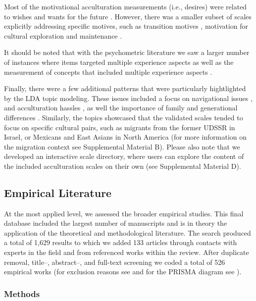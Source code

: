 Most of the motivational acculturation measurements (i.e., desires) were
related to wishes and wants for the future
\citep[e.g.,][]{Mancini2014, Ben-Shalom2003}. However, there was a
smaller subset of scales explicitly addressing specific motives, such as
transition motives \citep[][]{Mchitarjan2015}, motivation for cultural
exploration and maintenance \citep[][]{Recker2017}.

It should be noted that with the psychometric literature we saw a larger
number of instances where items targeted multiple experience aspects
\citep[e.g., enjoyment of wearing traditional clothing][]{Ozer2016} as
well as the measurement of concepts that included multiple experience
aspects \citep[e.g., satisfaction,][]{Cuellar1995a}.

Finally, there were a few additional patterns that were particularly
hightlighted by the LDA topic modeling. These issues included a focus on
navigational issues \citep[e.g.,][]{Harder2018}, and acculturation
hassles \citep[e.g.,][]{Vinokurov2002}, as well the importance of family
and generational differences \citep[e.g.,][]{ICSEYteam2006, Lee2004b}.
Similarly, the topics showcased that the validated scales tended to
focus on specific cultural pairs, such as migrants from the former UDSSR
in Israel, or Mexicans and East Asians in North America (for more
information on the migration context see Supplemental Material B).
Please also note that we developed an interactive scale directory, where
users can explore the content of the included acculturation scales on
their own (see Supplemental Material D). \color{black}

\subsection{Empirical Literature}

At the most applied level, we assessed the broader empirical studies.
This final database included the largest number of manuscripts and is in
theory the application of the theoretical and methodological literature.
The search produced a total of 1,629 results to which we added 133
articles through contacts with experts in the field and from referenced
works within the review. After duplicate removal, title--, abstract--,
and full-text screening we coded a total of 526 empirical works (for
exclusion reasons see  and for the PRISMA
diagram see ).

\subsubsection{Methods}

